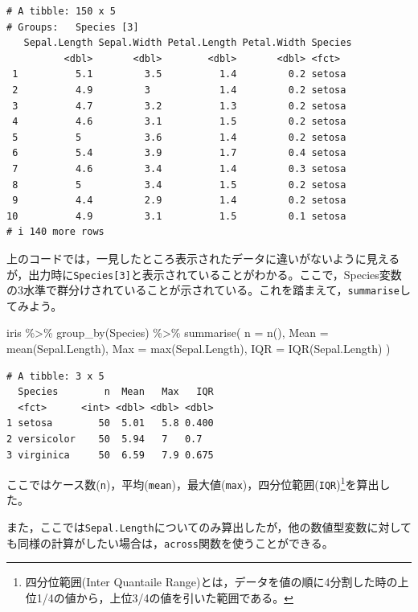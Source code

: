 \documentclass[
  a4paper,
]{ltjsbook}
\newenvironment{Shaded}{\begin{snugshade}}{\end{snugshade}}
\newcommand{\AttributeTok}[1]{\textcolor[rgb]{0.40,0.45,0.13}{#1}}
\newcommand{\FunctionTok}[1]{\textcolor[rgb]{0.28,0.35,0.67}{#1}}
\newcommand{\NormalTok}[1]{\textcolor[rgb]{0.00,0.23,0.31}{#1}}
\newcommand{\SpecialCharTok}[1]{\textcolor[rgb]{0.37,0.37,0.37}{#1}}
\begin{document}
\begin{verbatim}
# A tibble: 150 x 5
# Groups:   Species [3]
   Sepal.Length Sepal.Width Petal.Length Petal.Width Species
          <dbl>       <dbl>        <dbl>       <dbl> <fct>  
 1          5.1         3.5          1.4         0.2 setosa 
 2          4.9         3            1.4         0.2 setosa 
 3          4.7         3.2          1.3         0.2 setosa 
 4          4.6         3.1          1.5         0.2 setosa 
 5          5           3.6          1.4         0.2 setosa 
 6          5.4         3.9          1.7         0.4 setosa 
 7          4.6         3.4          1.4         0.3 setosa 
 8          5           3.4          1.5         0.2 setosa 
 9          4.4         2.9          1.4         0.2 setosa 
10          4.9         3.1          1.5         0.1 setosa 
# i 140 more rows
\end{verbatim}

上のコードでは，一見したところ表示されたデータに違いがないように見えるが，出力時に\texttt{Species{[}3{]}}と表示されていることがわかる。ここで，Species変数の3水準で群分けされていることが示されている。これを踏まえて，\texttt{summarise}してみよう。

\begin{Shaded}
\begin{Highlighting}[]
\NormalTok{iris }\SpecialCharTok{\%\textgreater{}\%}
  \FunctionTok{group\_by}\NormalTok{(Species) }\SpecialCharTok{\%\textgreater{}\%}
  \FunctionTok{summarise}\NormalTok{(}
    \AttributeTok{n =} \FunctionTok{n}\NormalTok{(),}
    \AttributeTok{Mean =} \FunctionTok{mean}\NormalTok{(Sepal.Length),}
    \AttributeTok{Max =} \FunctionTok{max}\NormalTok{(Sepal.Length),}
    \AttributeTok{IQR =} \FunctionTok{IQR}\NormalTok{(Sepal.Length)}
\NormalTok{  )}
\end{Highlighting}
\end{Shaded}

\begin{verbatim}
# A tibble: 3 x 5
  Species        n  Mean   Max   IQR
  <fct>      <int> <dbl> <dbl> <dbl>
1 setosa        50  5.01   5.8 0.400
2 versicolor    50  5.94   7   0.7  
3 virginica     50  6.59   7.9 0.675
\end{verbatim}

ここではケース数(\texttt{n})，平均(\texttt{mean})，最大値(\texttt{max})，四分位範囲(\texttt{IQR})\footnote{四分位範囲(Inter
  Quantaile
  Range)とは，データを値の順に4分割した時の上位1/4の値から，上位3/4の値を引いた範囲である。}を算出した。

また，ここでは\texttt{Sepal.Length}についてのみ算出したが，他の数値型変数に対しても同様の計算がしたい場合は，\texttt{across}関数を使うことができる。
\end{document}
